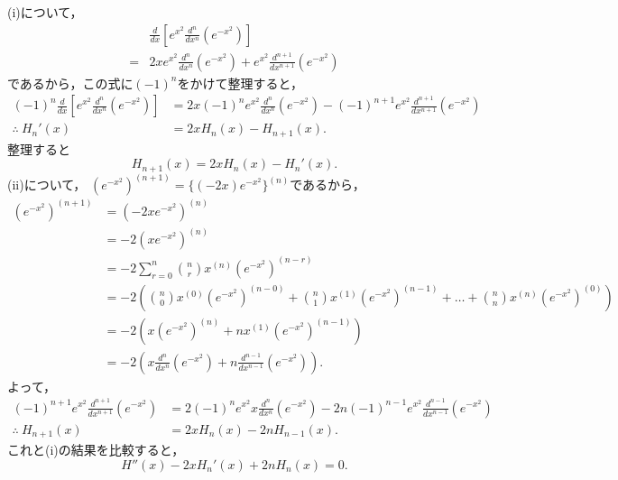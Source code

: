 \begin{tproof}
  (i)について，
  \begin{align*}
      & \frac{d}{dx} \left[ e^{x^2} \frac{d^n}{dx^n} (e^{-x^2} )\right]                      \\
    = & 2x e^{x^2} \frac{d^n}{dx^n} (e^{-x^2}) + e^{x^2} \frac{d^{n+1}}{dx^{n+1}} (e^{-x^2})
  \end{align*}
  であるから，この式に$(-1)^n$をかけて整理すると，
  \begin{align*}
    (-1)^n \frac{d}{dx} \left[ e^{x^2} \frac{d^n}{dx^n} (e^{-x^2} )\right] & = 2x(-1)^n e^{x^2} \frac{d^n}{dx^n} (e^{-x^2}) -(-1)^{n+1} e^{x^2} \frac{d^{n+1}}{dx^{n+1}} (e^{-x^2}) \\
    \therefore ~ H_n ' (x)                                                 & = 2x H_n(x) - H_{n+1}(x).
  \end{align*}
  整理すると
  \[
    H_{n+1}(x) =  2x H_n(x)-H_n'(x).
  \]
  (ii)について，
  $ (e^{-x^2})^{(n+1)} = \{ (-2x)e^{-x^2} \}^{(n)}$であるから，
  \begin{align*}
    (e^{-x^2})^{(n+1)} & = (-2xe^{-x^2})^{(n)}                                                                                                                                  \\
                       & = -2 (xe^{-x^2})^{(n)}                                                                                                                                 \\
                       & = -2 \sum_{r=0}^{n} \binom{n}{r} x^{(n)} (e^{-x^2})^{(n-r)}                                                                                            \\
                       & = -2 \left ( \binom{n}{0} x^{(0)} (e^{-x^2})^{(n-0)} + \binom{n}{1} x^{(1)} (e^{-x^2})^{(n-1)} + \dots + \binom{n}{n} x^{(n)} (e^{-x^2})^{(0)} \right) \\
                       & = -2 \left(  x (e^{-x^2})^{(n)} + n x^{(1)} (e^{-x^2})^{(n-1)} \right)                                                                                 \\
                       & = -2 \left ( x \frac{d^n}{dx^n} (e^{-x^2}) + n \frac{d^{n-1}}{dx^{n-1}} (e^{-x^2}) \right).
  \end{align*}
  よって，
  \begin{align*}
    (-1)^{n+1} e^{x^2} \frac{d^{n+1}}{d x^{n+1}} (e^{-x^2}) & = 2 (-1)^n e^{x^2} x \frac{d^n}{dx^n} (e^{-x^2}) -2 n (-1)^{n-1} e^{x^2}\frac{d^{n-1}}{dx^{n-1}} (e^{-x^2}) \\
    \therefore ~ H_{n+1} (x)                                & = 2x H_n(x) - 2nH_{n-1}(x).
  \end{align*}
  これと(i)の結果を比較すると，
  \[
    H '' (x) - 2x H_n' (x) + 2nH_n (x)=0.
  \]
\end{tproof}

